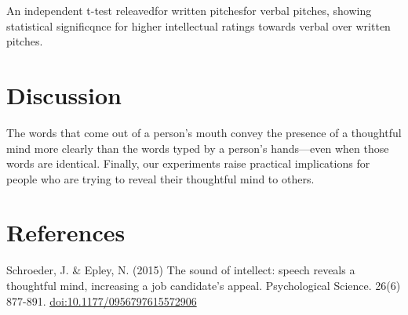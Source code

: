 \documentclass[man]{apa6}
\begin{document}
An independent t-test releavedfor written pitchesfor verbal pitches,
showing statistical significqnce for higher intellectual ratings towards
verbal over written pitches.

\section{Discussion}\label{discussion}

The words that come out of a person's mouth convey the presence of a
thoughtful mind more clearly than the words typed by a person's
hands---even when those words are identical. Finally, our experiments
raise practical implications for people who are trying to reveal their
thoughtful mind to others.

\newpage

\section{References}\label{references}

Schroeder, J. \& Epley, N. (2015) The sound of intellect: speech reveals
a thoughtful mind, increasing a job candidate's appeal. Psychological
Science. 26(6) 877-891. \url{doi:10.1177/0956797615572906}

\begingroup
\setlength{\parindent}{-0.5in} \setlength{\leftskip}{0.5in}

\hypertarget{refs}{}

\endgroup
\end{document}
